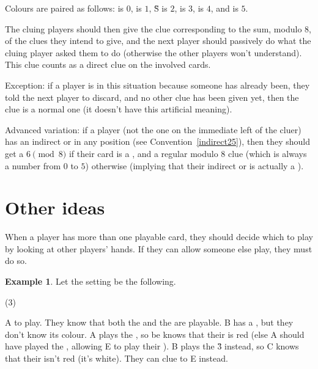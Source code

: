 \documentclass[a4paper]{article}
\theoremstyle{plain}
\theoremstyle{definition}
\newtheorem{example}[theorem]{Example}
\begin{document}
Colours are paired as follows:  is $0$,  is $1$, \G{S} is $2$,  is $3$,  is $4$, and  is $5$.

The cluing players should then give the clue corresponding to the sum, modulo 8, of the clues they intend to give, and the next player should passively do what the cluing player asked them to do (otherwise the other players won't understand). This clue counts as a direct clue on the involved cards.

Exception: if a player is in this situation because someone has already been, they told the next player to discard, and no other clue has been given yet, then the clue is a normal one (it doesn't have this artificial meaning).

Advanced variation: if a player (not the one on the immediate left of the cluer) has an indirect  or  in any position (see Convention~\ref{indirect25}), then they should get a $6 \pmod 8$ if their card is a , and a regular modulo $8$ clue (which is always a number from $0$ to $5$) otherwise (implying that their indirect  or  is actually a ).

\section{Other ideas}

When a player has more than one playable card, they should decide which to play by looking at other players' hands. If they can allow someone else play, they must do so.

\begin{example}
	
	Let the setting be the following.
	
	\begin{tasks}(3)
		\task[+]      
		\task[A]    
		\task[B]    
		\task[C]    
		\task[D]    
		\task[E]    
	\end{tasks}
	
	A to play. They know that both the  and the  are playable. B has a , but they don't know its colour. A plays the , so be knows that their  is red (else A should have played the , allowing E to play their ). B plays the \G{3} instead, so C knows that their  isn't red (it's white). They can clue  to E instead.
\end{example}
\end{document}
